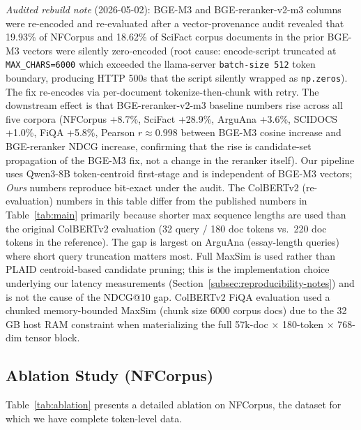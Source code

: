 \documentclass[review,1p]{elsarticle}
\begin{document}
\begin{table}[ht]
\vspace{4pt}
{\footnotesize \textit{Audited rebuild note} (2026-05-02): BGE-M3 and BGE-reranker-v2-m3 columns were re-encoded and re-evaluated after a vector-provenance audit revealed that 19.93\% of NFCorpus and 18.62\% of SciFact corpus documents in the prior BGE-M3 vectors were silently zero-encoded (root cause: encode-script truncated at \texttt{MAX\_CHARS=6000} which exceeded the llama-server \texttt{batch-size 512} token boundary, producing HTTP 500s that the script silently wrapped as \texttt{np.zeros}). The fix re-encodes via per-document tokenize-then-chunk with retry. The downstream effect is that BGE-reranker-v2-m3 baseline numbers rise across all five corpora (NFCorpus +8.7\%, SciFact +28.9\%, ArguAna +3.6\%, SCIDOCS +1.0\%, FiQA +5.8\%, Pearson $r \approx 0.998$ between BGE-M3 cosine increase and BGE-reranker NDCG increase, confirming that the rise is candidate-set propagation of the BGE-M3 fix, not a change in the reranker itself). Our pipeline uses Qwen3-8B token-centroid first-stage and is independent of BGE-M3 vectors; \emph{Ours} numbers reproduce bit-exact under the audit. The ColBERTv2 (re-evaluation) numbers in this table differ from the published numbers in Table~\ref{tab:main} primarily because shorter max sequence lengths are used than the original ColBERTv2 evaluation (32 query / 180 doc tokens vs.\ 220 doc tokens in the reference). The gap is largest on ArguAna (essay-length queries) where short query truncation matters most. Full MaxSim is used rather than PLAID centroid-based candidate pruning; this is the implementation choice underlying our latency measurements (Section~\ref{subsec:reproducibility-notes}) and is not the cause of the NDCG@10 gap. ColBERTv2 FiQA evaluation used a chunked memory-bounded MaxSim (chunk size 6000 corpus docs) due to the 32\,GB host RAM constraint when materializing the full 57k-doc $\times$ 180-token $\times$ 768-dim tensor block. \par}
\end{table}

\subsection{Ablation Study (NFCorpus)}
\label{subsec:ablation}

Table~\ref{tab:ablation} presents a detailed ablation on NFCorpus, the dataset for which we have complete token-level data.
\end{document}
